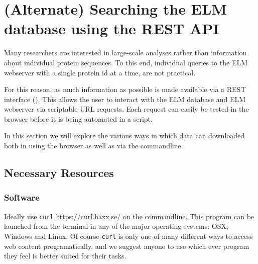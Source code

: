 \section{(Alternate) Searching the ELM database using the REST API}
\label{sec:search_REST}

Many researchers are interested in large-scale analyses rather than
information about individual protein sequences. To this end, individual
queries to the ELM webserver with a single protein id at a time, are not
practical.

For this reason, as much information as possible is made available via a
REST interface (\cite{Fielding_2002}). This allows the user to interact
with the ELM database and ELM webserver via scriptable URL requests.
Each request can easily be tested in the browser before it is being
automated in a script.

In this section we will explore the various ways in which data can
downloaded both in using the browser as well as via the commandline.

%
%
\subsection{Necessary Resources}\label{necessary-resources-3}

\subsubsection{Software}\label{software-1}

Ideally use \texttt{curl} https://curl.haxx.se/ on the commandline. This
program can be launched from the terminal in any of the major operating
systems: OSX, Windows and Linux. Of course \texttt{curl} is only one of
many different ways to access web content programatically, and we
suggest anyone to use which ever program they feel is better suited for
their tasks.

